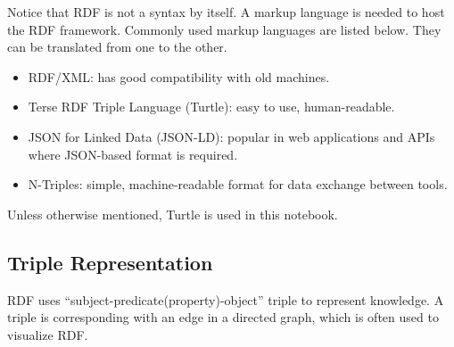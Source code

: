 Notice that RDF is not a syntax by itself. A markup language is needed to host the RDF framework. Commonly used markup languages are listed below. They can be translated from one to the other.
\begin{itemize}
  \item RDF/XML: has good compatibility with old machines.
  \item Terse RDF Triple Language (Turtle): easy to use, human-readable.
  \item JSON for Linked Data (JSON-LD): popular in web applications and APIs where JSON-based format is required.
  \item N-Triples: simple, machine-readable format for data exchange between tools.
\end{itemize}
Unless otherwise mentioned, Turtle is used in this notebook.

\subsection{Triple Representation}

RDF uses ``subject-predicate(property)-object'' triple to represent knowledge. A triple is corresponding with an edge in a directed graph, which is often used to visualize RDF. 


